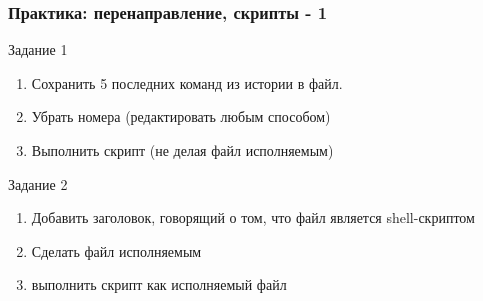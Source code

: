 \begin{frame}
  \frametitle{Практика: перенаправление, скрипты - 1} 

  \alert{Задание 1}
  \begin{enumerate}
    \item Сохранить 5 последних команд из истории в файл.
    \item Убрать номера (редактировать любым способом)
    \item Выполнить скрипт (не делая файл исполняемым)
  \end{enumerate}
  \pause

  \alert{Задание 2}
  \begin{enumerate}
    \item Добавить заголовок, говорящий о том, что файл является shell-скриптом
    \item Сделать файл исполняемым
    \item выполнить скрипт как исполняемый файл
  \end{enumerate}
\end{frame}
